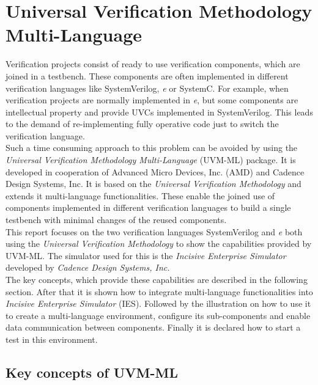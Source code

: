 \section{Universal Verification Methodology Multi-Language}\label{uvm_ml}
Verification projects consist of ready to use verification components, which are joined in a testbench. These components
are often implemented in different verification languages like SystemVerilog, \textit{e} or SystemC. For
example, when verification projects are normally implemented in \textit{e}, but some components are intellectual
property and provide UVCs implemented in SystemVerilog. This leads to the demand of re-implementing fully
operative code just to switch the verification language.\\
Such a time consuming approach to this problem can be avoided by using the \emph{Universal Verification Methodology
Multi-Language} (UVM-ML) \cite{uvm_ml_user} package. It is developed in cooperation of Advanced Micro Devices, Inc. (AMD) and Cadence Design
Systems, Inc. It is based on the \emph{Universal Verification Methodology} and extends it multi-language
functionalities. These enable the joined use of components implemented in different verification languages to build a
single testbench with minimal changes of the reused components.\\
This report focuses on the two verification languages SystemVerilog and \textit{e} both using the \emph{Universal
Verification Methodology} to show the capabilities provided by UVM-ML. The simulator used for this is the
\emph{Incisive Enterprise Simulator} developed by \emph{Cadence Design Systems, Inc.}\\
The key concepts, which provide these capabilities are described in the following section. After that it is shown how to
integrate multi-language functionalities into \emph{Incisive Enterprise Simulator} (IES). Followed by the illustration on how
to use it to create a multi-language environment, configure its sub-components and enable data communication between
components. Finally it is declared how to start a test in this environment.

\subsection{Key concepts of UVM-ML}

